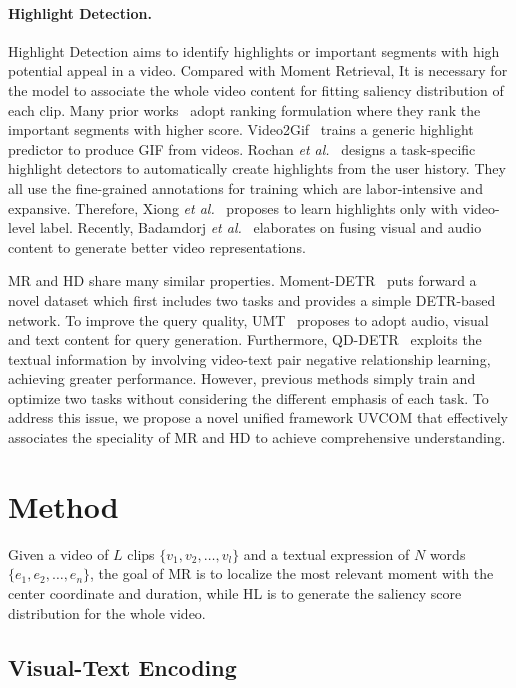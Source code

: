 \documentclass[10pt,twocolumn,letterpaper]{article}
\begin{document}
\vspace{-10pt} 
\paragraph{Highlight Detection.} Highlight Detection aims to identify highlights or important segments with high potential appeal in a video. Compared with Moment Retrieval, It is necessary for the model to associate the whole video content for fitting saliency distribution of each clip. Many prior works~\cite{Yao_2016, video2gif, Yao_2016, LIM-s, cvs} adopt ranking formulation where they rank the important segments with higher score. Video2Gif~\cite{video2gif} trains a generic highlight predictor to produce GIF from videos. Rochan \textit{et al.}~\cite{Rochan_2020} designs a task-specific highlight detectors to automatically create highlights from the user history. They all use the fine-grained annotations for training which are labor-intensive and expansive. Therefore, Xiong \textit{et al.}~\cite{LIM-s} proposes to learn highlights only with video-level label. Recently, Badamdorj \textit{et al.}~\cite{joint_va} elaborates on fusing visual and audio content to generate better video representations.

MR and HD share many similar properties. Moment-DETR~\cite{momentdetr} puts forward a novel dataset which first includes two tasks and provides a simple DETR-based~\cite{detr} network. To improve the query quality, UMT~\cite{umt} proposes to adopt audio, visual and text content for query generation. Furthermore, QD-DETR~\cite{qddetr} exploits the textual information by involving video-text pair negative relationship learning, achieving greater performance. However, previous methods simply train and optimize two tasks without considering the different emphasis of each task. To address this issue, we propose a novel unified framework UVCOM that effectively associates the speciality of MR and HD to achieve comprehensive understanding. 
 \section{Method}

Given a video of $L$ clips $\{v_1, v_2, \dots, v_l\}$ and a textual expression of $N$ words $\{e_1, e_2, \dots, e_n\}$, the goal of MR is to localize the most relevant moment with the center coordinate and duration, while HL is to generate the saliency score distribution for the whole video.

\subsection{Visual-Text Encoding}
\label{sec:visual-text encoding}
\end{document}

